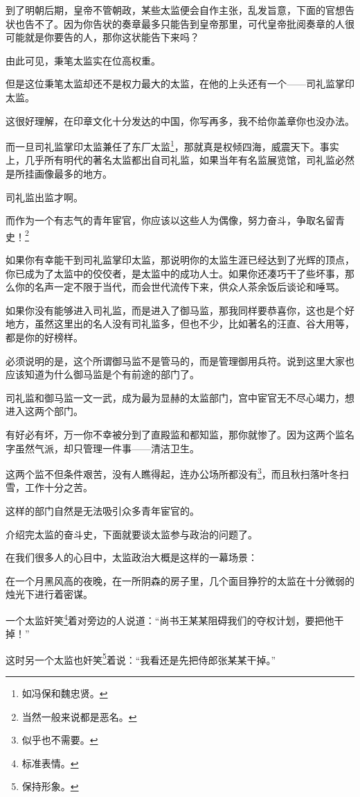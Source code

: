 \begin{multicols}{\theparacolNo}
到了明朝后期，皇帝不管朝政，某些太监便会自作主张，乱发旨意，下面的官想告状也告不了。因为你告状的奏章最多只能告到皇帝那里，可代皇帝批阅奏章的人很可能就是你要告的人，那你这状能告下来吗？

由此可见，秉笔太监实在位高权重。

但是这位秉笔太监却还不是权力最大的太监，在他的上头还有一个——司礼监掌印太监。

这很好理解，在印章文化十分发达的中国，你写再多，我不给你盖章你也没办法。

而一旦司礼监掌印太监兼任了东厂太监\footnote{如冯保和魏忠贤。}，那就真是权倾四海，威震天下。事实上，几乎所有明代的著名太监都出自司礼监，如果当年有名监展览馆，司礼监必然是所挂画像最多的地方。

司礼监出监才啊。

而作为一个有志气的青年宦官，你应该以这些人为偶像，努力奋斗，争取名留青史！\footnote{当然一般来说都是恶名。}

如果你有幸能干到司礼监掌印太监，那说明你的太监生涯已经达到了光辉的顶点，你已成为了太监中的佼佼者，是太监中的成功人士。如果你还凑巧干了些坏事，那么你的名声一定不限于当代，而会世代流传下来，供众人茶余饭后谈论和唾骂。

如果你没有能够进入司礼监，而是进入了御马监，那我同样要恭喜你，这也是个好地方，虽然这里出的名人没有司礼监多，但也不少，比如著名的汪直、谷大用等，都是你的好榜样。

必须说明的是，这个所谓御马监不是管马的，而是管理御用兵符。说到这里大家也应该知道为什么御马监是个有前途的部门了。

司礼监和御马监一文一武，成为最为显赫的太监部门，宫中宦官无不尽心竭力，想进入这两个部门。

有好必有坏，万一你不幸被分到了直殿监和都知监，那你就惨了。因为这两个监名字虽然气派，却只管理一件事——清洁卫生。

这两个监不但条件艰苦，没有人瞧得起，连办公场所都没有\footnote{似乎也不需要。}，而且秋扫落叶冬扫雪，工作十分之苦。

这样的部门自然是无法吸引众多青年宦官的。

介绍完太监的奋斗史，下面就要谈太监参与政治的问题了。

在我们很多人的心目中，太监政治大概是这样的一幕场景：

在一个月黑风高的夜晚，在一所阴森的房子里，几个面目狰狞的太监在十分微弱的烛光下进行着密谋。

一个太监奸笑\footnote{标准表情。}着对旁边的人说道：“尚书王某某阻碍我们的夺权计划，要把他干掉！”

这时另一个太监也奸笑\footnote{保持形象。}着说：“我看还是先把侍郎张某某干掉。”


\end{multicols}
